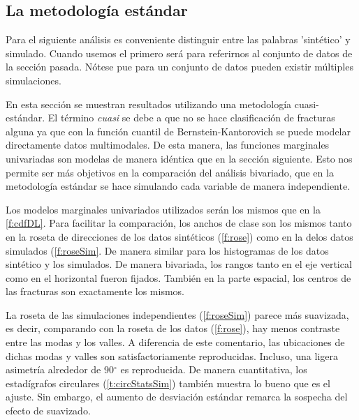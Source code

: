 \subsection{La metodolog\'ia est\'andar}

Para el siguiente an\'alisis es conveniente distinguir entre las palabras 'sint\'etico' y simulado. Cuando usemos el primero ser\'a para referirnos al conjunto de datos de la secci\'on pasada. N\'otese pue para un conjunto de datos pueden existir m\'ultiples simulaciones.

En esta secci\'on se muestran resultados utilizando una metodolog\'ia cuasi-est\'andar. El t\'ermino \textit{cuasi} se debe a que no se hace clasificaci\'on de fracturas alguna ya que con la funci\'on cuantil de Bernstein-Kantorovich se puede modelar directamente datos multimodales. De esta manera, las funciones marginales univariadas son modelas de manera id\'entica que en la secci\'on siguiente. Esto nos permite ser m\'as objetivos en la comparaci\'on del an\'alisis bivariado, que en la metodolog\'ia est\'andar se hace simulando cada variable de manera independiente.

Los modelos marginales univariados utilizados ser\'an los mismos que en la \autoref{f:cdfDL}. Para facilitar la comparaci\'on, los anchos de clase son los mismos tanto en la roseta de direcciones de los datos sint\'eticos (\autoref{f:rose}) como en la delos datos simulados (\autoref{f:roseSim}. De manera similar para los histogramas de los datos sint\'etico y los simulados. De manera bivariada, los rangos tanto en el eje vertical como en el horizontal fueron fijados. Tambi\'en en la parte espacial, los centros de las fracturas son exactamente los mismos.

La roseta de las simulaciones independientes (\autoref{f:roseSim}) parece m\'as suavizada, es decir, comparando con la roseta de los datos (\autoref{f:rose}), hay menos contraste entre las modas y los valles. A diferencia de este comentario, las ubicaciones de dichas modas y valles son satisfactoriamente reproducidas. Incluso, una ligera asimetr\'ia alrededor de 90$^\circ$ es reproducida. De manera cuantitativa, los estad\'igrafos circulares (\autoref{t:circStatsSim}) tambi\'en muestra lo bueno que es el ajuste. Sin embargo, el aumento de desviaci\'on est\'andar remarca la sospecha del efecto de suavizado.


